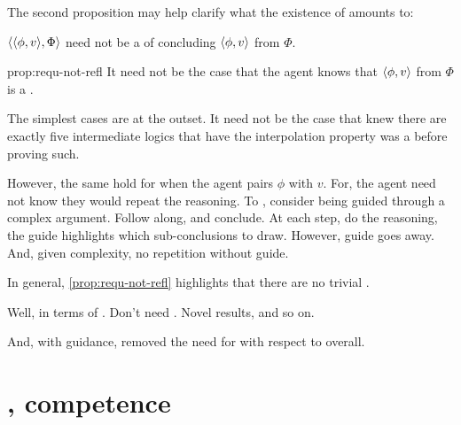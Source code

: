 \begin{note}
  The second proposition may help clarify what the existence of  amounts to:

  \begin{proposition}
    \label{prop:requ-not-refl}
    \(\langle \langle \phi, v \rangle, \Phi \rangle\) need not be a \requ{} of concluding \(\langle \phi, v \rangle\) from \(\Phi\).
  \end{proposition}
  \begin{argument}{prop:requ-not-refl}
    It need not be the case that the agent knows that \(\langle \phi, v \rangle\) from \(\Phi\) is a \fc{}.

    The simplest cases are at the outset.
    It need not be the case that \citeauthor{Maksimova:1977un} knew there are exactly five intermediate logics that have the interpolation property was a \fc{} before proving such.

    However, the same hold for when the agent pairs \(\phi\) with \(v\).
    For, the agent need not know they would repeat the reasoning.
    To , consider being guided through a complex argument.
    Follow along, and conclude.
    At each step, do the reasoning, the guide highlights which sub-conclusions to draw.
    However, guide goes away.
    And, given complexity, no repetition without guide.
  \end{argument}

  In general, \autoref{prop:requ-not-refl} highlights that there are no trivial .

  Well, in terms of \sR{}.
  Don't need \sR{}.
  Novel results, and so on.

  And, with guidance, removed the need for \sR{} with respect to overall.
\end{note}

\section{, competence}
\label{cha:requs:sec:add-illu}

